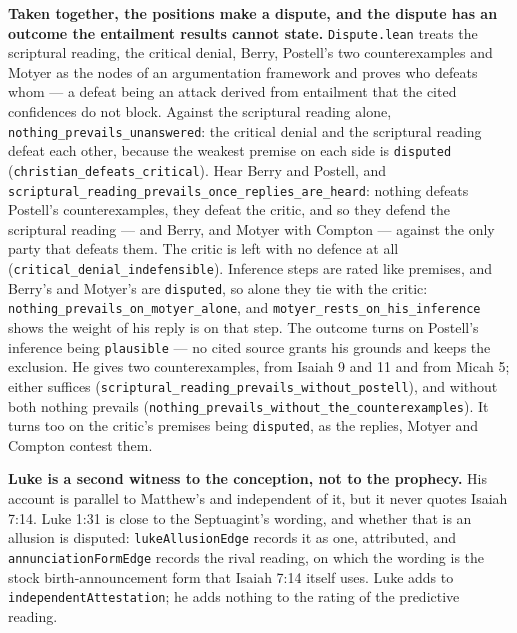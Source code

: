 \documentclass[11pt]{article}
\begin{document}
\textbf{Taken together, the positions make a dispute, and the dispute has an outcome the entailment results cannot state.} \texttt{Dispute.lean} treats the scriptural reading, the critical denial, Berry, Postell's two counterexamples and Motyer as the nodes of an argumentation framework and proves who defeats whom — a defeat being an attack derived from entailment that the cited confidences do not block. Against the scriptural reading alone, \texttt{nothing\_\allowbreak{}prevails\_\allowbreak{}unanswered}: the critical denial and the scriptural reading defeat each other, because the weakest premise on each side is \texttt{disputed} (\texttt{christian\_\allowbreak{}defeats\_\allowbreak{}critical}). Hear Berry and Postell, and \texttt{scriptural\_\allowbreak{}reading\_\allowbreak{}prevails\_\allowbreak{}once\_\allowbreak{}replies\_\allowbreak{}are\_\allowbreak{}heard}: nothing defeats Postell's counterexamples, they defeat the critic, and so they defend the scriptural reading — and Berry, and Motyer with Compton — against the only party that defeats them. The critic is left with no defence at all (\texttt{critical\_\allowbreak{}denial\_\allowbreak{}indefensible}). Inference steps are rated like premises, and Berry's and Motyer's are \texttt{disputed}, so alone they tie with the critic: \texttt{nothing\_\allowbreak{}prevails\_\allowbreak{}on\_\allowbreak{}motyer\_\allowbreak{}alone}, and \texttt{motyer\_\allowbreak{}rests\_\allowbreak{}on\_\allowbreak{}his\_\allowbreak{}inference} shows the weight of his reply is on that step. The outcome turns on Postell's inference being \texttt{plausible} — no cited source grants his grounds and keeps the exclusion. He gives two counterexamples, from Isaiah 9 and 11 and from Micah 5; either suffices (\texttt{scriptural\_\allowbreak{}reading\_\allowbreak{}prevails\_\allowbreak{}without\_\allowbreak{}postell}), and without both nothing prevails (\texttt{nothing\_\allowbreak{}prevails\_\allowbreak{}without\_\allowbreak{}the\_\allowbreak{}counterexamples}). It turns too on the critic's premises being \texttt{disputed}, as the replies, Motyer and Compton contest them.

\textbf{Luke is a second witness to the conception, not to the prophecy.} His account is parallel to Matthew's and independent of it, but it never quotes Isaiah 7:14. Luke 1:31 is close to the Septuagint's wording, and whether that is an allusion is disputed: \texttt{luke\allowbreak{}Allusion\allowbreak{}Edge} records it as one, attributed, and \texttt{annunciation\allowbreak{}Form\allowbreak{}Edge} records the rival reading, on which the wording is the stock birth-announcement form that Isaiah 7:14 itself uses. Luke adds to \texttt{independent\allowbreak{}Attestation}; he adds nothing to the rating of the predictive reading.
\end{document}

